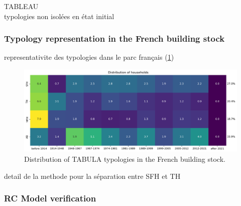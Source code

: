 \documentclass[11pt]{article}
\begin{document}
        TABLEAU\\

        typologies non isolées en état initial 

        \subsubsection{Typology representation in the French building stock} %
        \label{ssub:typologies_distribution}
        
        representativite des typologies dans le parc français (\ref{fig:tab_stock})

        \begin{figure}[ht]
            \centering
            \includegraphics[width=0.99\columnwidth]{figures/bgc_distribution_tabula_households_ponderated.png}
            \caption{\label{fig:tab_stock} Distribution of TABULA typologies in the French building stock.}
        \end{figure}

        detail de la methode pour la séparation entre SFH et TH

        





        \subsubsection{RC Model verification} %
        \label{ssub:model_verification}
        
\end{document}
